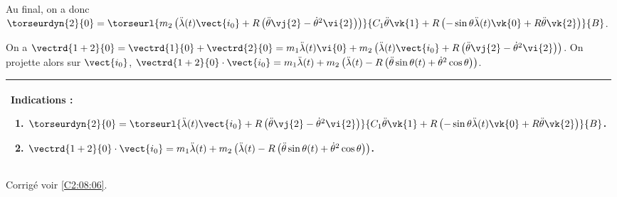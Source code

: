 Au final, on a donc $\torseurdyn{2}{0}=\torseurl{%
m_2\left(\ddot{\lambda}(t) \vect{i_0} + R \left(\ddot{\theta} \vj{2} - \dot{\theta}^2 \vi{2}\right)\right)
}{%
C_1  \ddot{\theta} \vk{1} + R\left( -\sin \theta \ddot{\lambda}(t) \vk{0} + R \ddot{\theta} \vk{2}\right)
}{B}$.
\else
\fi

\ifprof

On a $\vectrd{1+2}{0}=\vectrd{1}{0}+\vectrd{2}{0}=m_1\ddot{\lambda}(t)\vi{0}+m_2\left(\ddot{\lambda}(t) \vect{i_0} + R \left(\ddot{\theta} \vj{2} - \dot{\theta}^2 \vi{2}\right)\right)$.
On projette alors sur $\vect{i_0}$,
$\vectrd{1+2}{0}\cdot \vect{i_0} =m_1\ddot{\lambda}(t)+m_2\left(\ddot{\lambda}(t)-R \left(\ddot{\theta} \sin\theta(t)  + \dot{\theta}^2 \cos\theta \right)\right) $.
\else
\fi

\ifprof
\else
\footnotesize
\begin{center}
\begin{tabular}{|p{.9\linewidth}|}
\hline
Indications :
\begin{enumerate}
\item $\torseurdyn{2}{0}=\torseurl{\ddot{\lambda}(t) \vect{i_0} + R \left(\ddot{\theta} \vj{2} - \dot{\theta}^2 \vi{2}\right)}{C_1  \ddot{\theta} \vk{1} + R\left( -\sin \theta \ddot{\lambda}(t) \vk{0} + R \ddot{\theta} \vk{2}\right)}{B}$.
\item $\vectrd{1+2}{0}\cdot \vect{i_0}=m_1\ddot{\lambda}(t)+m_2\left(\ddot{\lambda}(t)- R \left(\ddot{\theta} \sin\theta(t)  + \dot{\theta}^2 \cos\theta \right)\right)$. 
\end{enumerate} \\ \hline
\end{tabular}
\end{center}
\normalsize
\begin{flushright}
\footnotesize{Corrigé  voir \ref{C2:08:06}.}
\end{flushright}%
\fi